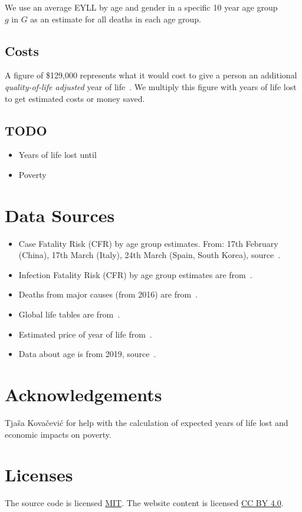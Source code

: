 \documentclass[12pt]{article}
\begin{document}
We use an average EYLL by age and gender in a specific 10 year age group $g \text{ in } G$ as an estimate
for all deaths in each age group.

\subsection*{Costs}
A figure of \$129,000 represents what it would cost to give a person an additional {\it quality-of-life adjusted} year of life~\cite{price}. We multiply this figure with years of life lost to get estimated costs or money saved.

\subsection*{TODO}
\begin{itemize}
\item Years of life lost until
\item Poverty
\end{itemize}
 

\section*{Data Sources}
\begin{itemize}
\item Case Fatality Risk (CFR) by age group estimates. From: 17th February (China), 17th March (Italy), 24th March (Spain, South Korea), source~\cite{cfrs}.
\item Infection Fatality Risk (CFR) by age group estimates are from~\cite{imperial}.
\item Deaths from major causes (from 2016) are from~\cite{major}.
\item Global life tables are from~\cite{expectancies}.
\item Estimated price of year of life from~\cite{price}.
\item Data about age is from 2019, source~\cite{pyramids}.
\end{itemize}

\section*{Acknowledgements}
Tjaša Kovačević for help with the calculation of expected years of life lost and economic impacts on poverty.

\section*{Licenses}
The source code is licensed \href{http://opensource.org/licenses/mit-license.php}{MIT}. The website content is licensed \href{https://creativecommons.org/licenses/by/4.0/deed.ast}{CC BY 4.0}.
\end{document}

